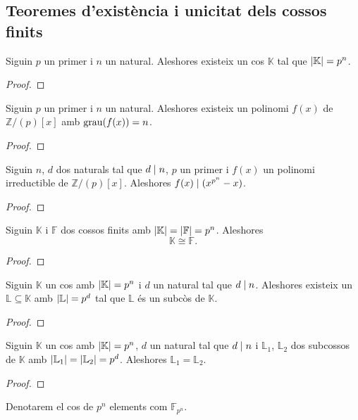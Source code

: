 \documentclass[../Apunts.tex]{subfiles}
\begin{document}
	\subsection{Teoremes d'existència i unicitat dels cossos finits}
	\begin{theorem}
		Siguin \(p\) un primer i \(n\) un natural. Aleshores existeix un cos \(\mathbb{K}\) tal que \(\abs{\mathbb{K}}=p^{n}\).
		\begin{proof}
		\end{proof}
	\end{theorem}
	\begin{corollary}
		Siguin \(p\) un primer i \(n\) un natural. Aleshores existeix un polinomi \(f(x)\) de \(\mathbb{Z}/(p)[x]\) amb \(\operatorname{grau}(f(x))=n\).
		\begin{proof}
		\end{proof}
	\end{corollary}
	\begin{lemma}
		Siguin \(n\), \(d\) dos naturals tal que \(d\mathrel{|} n\), \(p\) un primer i \(f(x)\) un polinomi irreductible de \(\mathbb{Z}/(p)[x]\). Aleshores \(f(x)\mathrel{|}(x^{p^{n}}-x)\).
		\begin{proof}
		\end{proof}
	\end{lemma}
	\begin{theorem}
		Siguin \(\mathbb{K}\) i \(\mathbb{F}\) dos cossos finits amb \(\abs{\mathbb{K}}=\abs{\mathbb{F}}=p^{n}\). Aleshores %
		\[\mathbb{K}\cong\mathbb{F}.\]
		\begin{proof}
		\end{proof}
	\end{theorem}
	\begin{theorem}
		Siguin \(\mathbb{K}\) un cos amb \(\abs{\mathbb{K}}=p^{n}\) i \(d\) un natural tal que \(d\mathrel{|} n\). Aleshores existeix un \(\mathbb{L}\subseteq\mathbb{K}\) amb \(\abs{\mathbb{L}}=p^{d}\) tal que \(\mathbb{L}\) és un subcòs de \(\mathbb{K}\).
		\begin{proof}
		\end{proof}
	\end{theorem}
	\begin{theorem}
		Siguin \(\mathbb{K}\) un cos amb \(\abs{\mathbb{K}}=p^{n}\), \(d\) un natural tal que \(d\mathrel{|} n\) i \(\mathbb{L}_{1}\), \(\mathbb{L}_{2}\) dos subcossos de \(\mathbb{K}\) amb \(\abs{\mathbb{L}_{1}}=\abs{\mathbb{L}_{2}}=p^{d}\). Aleshores \(\mathbb{L}_{1}=\mathbb{L}_{2}\).
		\begin{proof}
		\end{proof}
	\end{theorem}
	\begin{notation}
		Denotarem el cos de \(p^{n}\) elements com \(\mathbb{F}_{p^{n}}\).
	\end{notation}
\end{document}
